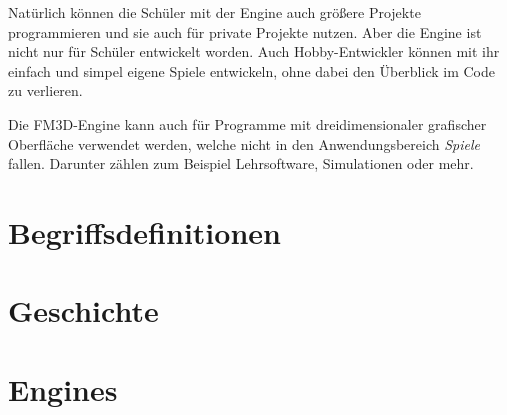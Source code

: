 Natürlich können die Schüler mit der Engine auch größere Projekte programmieren und sie auch für private Projekte nutzen. Aber die Engine ist nicht nur für Schüler entwickelt worden. Auch Hobby-Entwickler können mit ihr einfach und simpel eigene Spiele entwickeln, ohne dabei den Überblick im Code zu verlieren.

Die FM3D-Engine kann auch für Programme mit dreidimensionaler grafischer Oberfläche verwendet werden, welche nicht in den Anwendungsbereich \textit{Spiele} fallen. Darunter zählen zum Beispiel Lehrsoftware, Simulationen oder mehr.

\section{Begriffsdefinitionen}




\section{Geschichte}



\section{Engines}
\label{engines}



